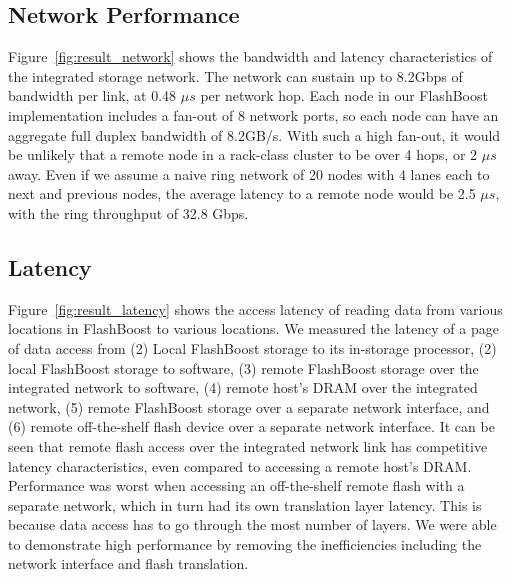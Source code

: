 \subsection{Network Performance}

Figure~\ref{fig:result_network} shows the bandwidth and latency characteristics
of the integrated storage network. The network can sustain up to 8.2Gbps of
bandwidth per link, at 0.48 $\mu s$ per network hop. Each node in our FlashBoost
implementation includes a fan-out of 8 network ports, so each node can have an
aggregate full duplex bandwidth of 8.2GB/s. With such a high fan-out, it would
be unlikely that a remote node in a rack-class cluster to be over 4 hops, or 2
$\mu s$ away. Even if we assume a naive ring network of 20 nodes with 4 lanes
each to next and previous nodes, the average latency to a remote node would be
2.5 $\mu s$, with the ring throughput of 32.8 Gbps.


\subsection{Latency}

Figure~\ref{fig:result_latency} shows the access latency of reading data from
various locations in FlashBoost to various locations. We measured the latency of
a page of data access from (2) Local FlashBoost storage to its in-storage
processor, (2) local FlashBoost storage to software, (3) remote FlashBoost
storage over the integrated network to software, (4) remote host's DRAM over the integrated
network, (5) remote FlashBoost storage over a separate network interface, and
(6) remote off-the-shelf flash device over a separate network interface. It
can be seen that remote flash access over the integrated network link has
competitive latency characteristics, even compared to accessing a remote host's
DRAM. Performance was worst when accessing an off-the-shelf remote flash with a separate
network, which in turn had its own translation layer latency. This is because
data access has to go through the most number of layers. We were able to
demonstrate high performance by removing the inefficiencies including the
network interface and flash translation.

